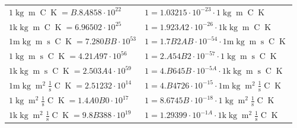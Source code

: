 \begin{center}
\begin{longtable}{l l}
{\color{black}$1 \bm{\mathrm{ }}\operatorname{kg}{\operatorname{m}}{}{\operatorname{C}}{\operatorname{K}} = B.8A858\cdot10^{22} $}   & {\color{black}$ 1 = 1.03215\cdot10^{-23} \cdot 1 \bm{\mathrm{ }}\operatorname{kg}{\operatorname{m}}{}{\operatorname{C}}{\operatorname{K}}$}  \\
{\color{gray}$1 \bm{\mathrm{ k}}\operatorname{kg}{\operatorname{m}}{}{\operatorname{C}}{\operatorname{K}} = 6.96502\cdot10^{25} $}   & {\color{gray}$ 1 = 1.923A2\cdot10^{-26} \cdot 1 \bm{\mathrm{ k}}\operatorname{kg}{\operatorname{m}}{}{\operatorname{C}}{\operatorname{K}}$}  \\
{\color{gray}$1 \bm{\mathrm{ m}}\operatorname{kg}{\operatorname{m}}{\operatorname{s}}{\operatorname{C}}{\operatorname{K}} = 7.280BB\cdot10^{53} $}   & {\color{gray}$ 1 = 1.7B2AB\cdot10^{-54} \cdot 1 \bm{\mathrm{ m}}\operatorname{kg}{\operatorname{m}}{\operatorname{s}}{\operatorname{C}}{\operatorname{K}}$}  \\
{\color{black}$1 \bm{\mathrm{ }}\operatorname{kg}{\operatorname{m}}{\operatorname{s}}{\operatorname{C}}{\operatorname{K}} = 4.21A97\cdot10^{56} $}   & {\color{black}$ 1 = 2.A54B2\cdot10^{-57} \cdot 1 \bm{\mathrm{ }}\operatorname{kg}{\operatorname{m}}{\operatorname{s}}{\operatorname{C}}{\operatorname{K}}$}  \\
{\color{gray}$1 \bm{\mathrm{ k}}\operatorname{kg}{\operatorname{m}}{\operatorname{s}}{\operatorname{C}}{\operatorname{K}} = 2.503A4\cdot10^{59} $}   & {\color{gray}$ 1 = 4.B645B\cdot10^{-5A} \cdot 1 \bm{\mathrm{ k}}\operatorname{kg}{\operatorname{m}}{\operatorname{s}}{\operatorname{C}}{\operatorname{K}}$}  \\
{\color{gray}$1 \bm{\mathrm{ m}}\operatorname{kg}{\operatorname{m}^2}\frac1{\operatorname{s}}{\operatorname{C}}{\operatorname{K}} = 2.51232\cdot10^{14} $}   & {\color{gray}$ 1 = 4.B4726\cdot10^{-15} \cdot 1 \bm{\mathrm{ m}}\operatorname{kg}{\operatorname{m}^2}\frac1{\operatorname{s}}{\operatorname{C}}{\operatorname{K}}$}  \\
{\color{black}$1 \bm{\mathrm{ }}\operatorname{kg}{\operatorname{m}^2}\frac1{\operatorname{s}}{\operatorname{C}}{\operatorname{K}} = 1.4A0B0\cdot10^{17} $}   & {\color{black}$ 1 = 8.6745B\cdot10^{-18} \cdot 1 \bm{\mathrm{ }}\operatorname{kg}{\operatorname{m}^2}\frac1{\operatorname{s}}{\operatorname{C}}{\operatorname{K}}$}  \\
{\color{gray}$1 \bm{\mathrm{ k}}\operatorname{kg}{\operatorname{m}^2}\frac1{\operatorname{s}}{\operatorname{C}}{\operatorname{K}} = 9.8B388\cdot10^{19} $}   & {\color{gray}$ 1 = 1.29399\cdot10^{-1A} \cdot 1 \bm{\mathrm{ k}}\operatorname{kg}{\operatorname{m}^2}\frac1{\operatorname{s}}{\operatorname{C}}{\operatorname{K}}$}  \\

\end{longtable}
\end{center}
